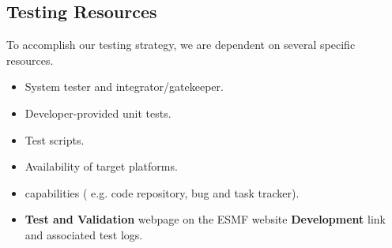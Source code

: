 \subsection{Testing Resources}

To accomplish our testing strategy, we are dependent on several specific
resources. 

\begin{itemize}
\item System tester and integrator/gatekeeper.
\item Developer-provided unit tests.
\item Test scripts.
\item Availability of target platforms.
\item {}
capabilities ( e.g. code repository, bug and task tracker).
\item {\bf Test and Validation} webpage on the ESMF website {\bf Development}
link and associated test logs.
\end{itemize}















